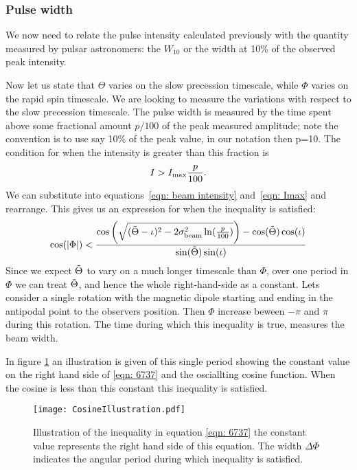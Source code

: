 \documentclass[/home/greg/Thesis/main/main.tex]{subfiles}
\begin{document}
\FloatBarrier
\subsubsection{Pulse width}
We now need to relate the pulse intensity calculated previously with the quantity
measured by pulsar astronomers: the $W_{10}$ or the width at 10\% of the observed peak
intensity.

Now let us state that $\Theta$ varies on the slow
precession timescale, while $\Phi$ varies on the rapid spin timescale. We are
looking to measure the variations with respect to the slow precession timescale.
The pulse width is measured by the time spent above some fractional amount $p/100$
of the peak measured amplitude; note the convention is to use say 10\% of the peak
value, in our notation then p=10. The condition for when the intensity is greater
than this fraction is
\begin{align}
I > I_{\textrm{max}} \frac{p}{100}.
\end{align}
We can substitute into equations~\eqref{eqn: beam intensity} and~\eqref{eqn: Imax}
and rearrange. This gives us an expression for when the inequality is satisfied:
\begin{equation}
\cos(|\Phi|) < \frac{\cos\left(\sqrt{
    (\tilde{\Theta} - \iota)^{2}-2\sigma_{\textrm{beam}}^{2} \ln(\frac{p}{100})}\right)-\cos(\tilde{\Theta})\cos(\iota)}
    {\sin(\tilde{\Theta})\sin(\iota)}
\label{eqn: 6737}
\end{equation}
Since we expect $\tilde{\Theta}$ to vary on a much longer timescale than $\Phi$, over 
one period in $\Phi$ we can treat $\tilde{\Theta}$, and hence the whole right-hand-side
as a constant. Lets consider a single rotation with the magnetic dipole
starting and ending in the antipodal point to the observers position. Then
$\Phi$ increase beween $-\pi$ and $\pi$ during this rotation. The
time during which this inequality is true, measures the beam width.

In figure \ref{fig: CosineIllustration} an illustration is given of this single
period showing the constant value on the right hand side of \eqref{eqn: 6737} and
the osciallting cosine function. When the cosine is less than this constant
this inequality is satisfied.
\begin{figure}[ht]
\centering
\texttt{[image: CosineIllustration.pdf]}
\caption{Illustration of the inequality in equation \eqref{eqn: 6737} the constant
         value represents the right hand side of this equation. The
         width $\Delta\Phi$ indicates the angular period during which inequality
         is satisfied.}
\label{fig: CosineIllustration}
\end{figure}
\end{document}
